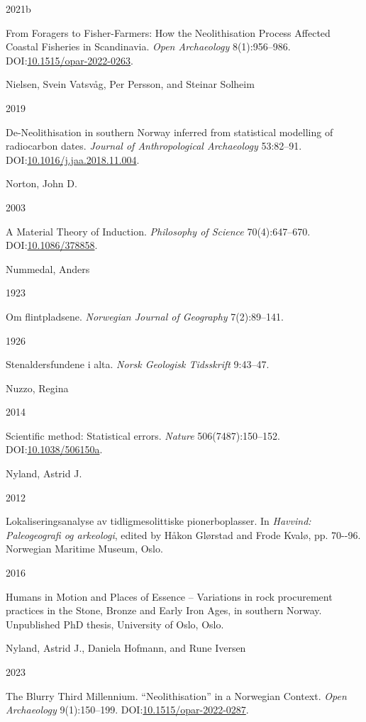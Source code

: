 \documentclass[
  12pt,
  a4paper,
  oneside]{book}
\newlength{\cslhangindent}
\newlength{\csllabelwidth}
\newlength{\cslentryspacingunit} %
\newenvironment{CSLReferences}[2] %
 {%
  \setlength{\parindent}{0pt}
  \ifodd #1
  \let\oldpar\par
  \def\par{\hangindent=\cslhangindent\oldpar}
  \fi
  \setlength{\parskip}{#2\cslentryspacingunit}
 }%
 {}
\newcommand{\CSLBlock}[1]{#1\hfill\break}
\newcommand{\CSLLeftMargin}[1]{\parbox[t]{\csllabelwidth}{#1}}
\newcommand{\CSLRightInline}[1]{\parbox[t]{\linewidth - \csllabelwidth}{#1}\break}
\begin{document}
\begin{CSLReferences}{0}{0}
\leavevmode{}%
\CSLLeftMargin{ 2021b }
\CSLRightInline{From Foragers to Fisher-Farmers: How the Neolithisation Process Affected Coastal Fisheries in Scandinavia. \emph{Open Archaeology} 8(1):956--986. DOI:\href{https://doi.org/10.1515/opar-2022-0263}{10.1515/opar-2022-0263}.}

\leavevmode{}%
\CSLBlock{Nielsen, Svein Vatsvåg, Per Persson, and Steinar Solheim}
\CSLLeftMargin{ 2019}
\CSLRightInline{De-Neolithisation in southern Norway inferred from statistical modelling of radiocarbon dates. \emph{Journal of Anthropological Archaeology} 53:82--91. DOI:\href{https://doi.org/10.1016/j.jaa.2018.11.004}{10.1016/j.jaa.2018.11.004}.}

\leavevmode{}%
\CSLBlock{Norton, John D.}
\CSLLeftMargin{ 2003}
\CSLRightInline{{A Material Theory of Induction}. \emph{Philosophy of Science} 70(4):647--670. DOI:\href{https://doi.org/10.1086/378858}{10.1086/378858}.}

\leavevmode{}%
\CSLBlock{Nummedal, Anders}
\CSLLeftMargin{ 1923}
\CSLRightInline{Om flintpladsene. \emph{Norwegian Journal of Geography} 7(2):89--141.}

\leavevmode{}%
\CSLLeftMargin{ 1926 }
\CSLRightInline{Stenaldersfundene i alta. \emph{Norsk Geologisk Tidsskrift} 9:43--47.}

\leavevmode{}%
\CSLBlock{Nuzzo, Regina}
\CSLLeftMargin{ 2014}
\CSLRightInline{{Scientific method: Statistical errors}. \emph{Nature} 506(7487):150--152. DOI:\href{https://doi.org/10.1038/506150a}{10.1038/506150a}.}

\leavevmode{}%
\CSLBlock{Nyland, Astrid J.}
\CSLLeftMargin{ 2012}
\CSLRightInline{{Lokaliseringsanalyse av tidligmesolittiske pionerboplasser}. In \emph{{Havvind: Paleogeografi og arkeologi}}, edited by Håkon Glørstad and Frode Kvalø, pp. 70-\/-96. Norwegian Maritime Museum, Oslo.}

\leavevmode{}%
\CSLLeftMargin{ 2016 }
\CSLRightInline{{Humans in Motion and Places of Essence -- Variations in rock procurement practices in the Stone, Bronze and Early Iron Ages, in southern Norway}. Unpublished PhD thesis, University of Oslo, Oslo.}

\leavevmode{}%
\CSLBlock{Nyland, Astrid J., Daniela Hofmann, and Rune Iversen}
\CSLLeftMargin{ 2023}
\CSLRightInline{{The Blurry Third Millennium. {``Neolithisation''} in a Norwegian Context}. \emph{Open Archaeology} 9(1):150--199. DOI:\href{https://doi.org/10.1515/opar-2022-0287}{10.1515/opar-2022-0287}.}


\end{CSLReferences}
\end{document}
